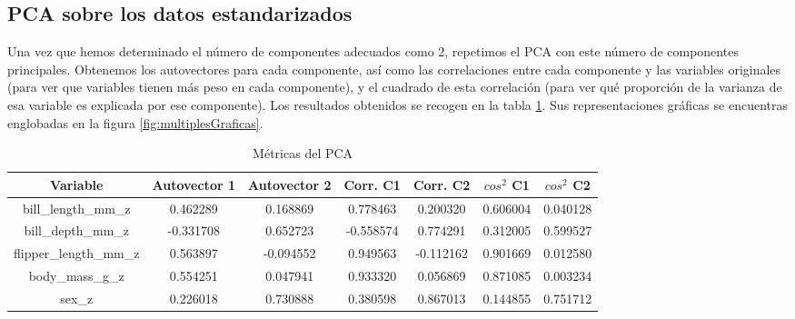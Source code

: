 \documentclass[a4paper,onecolumn]{extarticle}
\begin{document}
\begin{sloppypar}
\subsection{PCA sobre los datos estandarizados} \label{PCAest}
Una vez que hemos determinado el número de componentes adecuados como 2, repetimos el PCA con este número de componentes principales. Obtenemos los autovectores
para cada componente, así como las correlaciones entre cada componente y las variables originales (para ver que variables tienen más peso en cada componente), 
y el cuadrado de esta correlación (para ver qué proporción de la varianza de esa variable es explicada por ese componente). Los resultados obtenidos se recogen 
en la tabla \ref{tab:tablaPCA}. Sus representaciones gráficas se encuentras englobadas en la figura \ref{fig:multiplesGraficas}.
\begin{table}[h!]
    \begin{tabular}{|c|c|c|c|c|c|c|}
        \hline
        \textbf{Variable} & \textbf{Autovector 1} & \textbf{Autovector 2} & \textbf{Corr. C1}  & \textbf{Corr. C2} & \textbf{$cos^2$ C1} & \textbf{$cos^2$ C2} \\
        \hline
        bill\_length\_mm\_z    & 0.462289  & 0.168869  & 0.778463  & 0.200320  & 0.606004 & 0.040128 \\
        bill\_depth\_mm\_z     & -0.331708 & 0.652723  & -0.558574 & 0.774291  & 0.312005 & 0.599527 \\
        flipper\_length\_mm\_z & 0.563897  & -0.094552 & 0.949563  & -0.112162 & 0.901669 & 0.012580 \\
        body\_mass\_g\_z       & 0.554251  & 0.047941  & 0.933320  & 0.056869  & 0.871085 & 0.003234 \\
        sex\_z                 & 0.226018  & 0.730888  & 0.380598  & 0.867013  & 0.144855 & 0.751712 \\
        \hline
    \end{tabular} 
    \caption{Métricas del PCA}
    \label{tab:tablaPCA}
\end{table}


\end{sloppypar}
\end{document}
